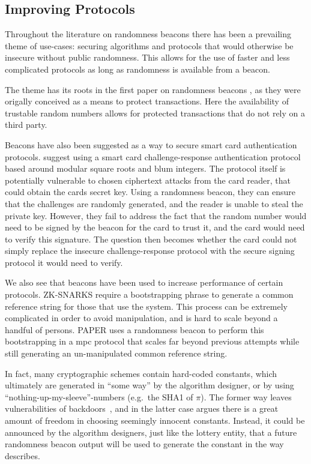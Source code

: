 \subsection{Improving Protocols}
Throughout the literature on randomness beacons there has been a prevailing theme of use-cases: securing algorithms and protocols that would otherwise be insecure without public randomness. This allows for the use of faster and less complicated protocols as long as randomness is available from a beacon.

The theme has its roots in the first paper on randomness beacons \cite{rabin1983transaction}, as they were origally conceived as a means to protect transactions. Here the availability of trustable random numbers allows for protected transactions that do not rely on a third party.

Beacons have also been suggested as a way to secure smart card authentication protocols. \citet{fischer2011publicrandomnessservice} suggest using a smart card challenge-response authentication protocol based around modular square roots and blum integers. The protocol itself is potentially vulnerable to chosen ciphertext attacks from the card reader, that could obtain the cards secret key. Using a randomness beacon, they can ensure that the challenges are randomly generated, and the reader is unable to steal the private key. However, they fail to address the fact that the random number would need to be signed by the beacon for the card to trust it, and the card would need to verify this signature. The question then becomes whether the card could not simply replace the insecure challenge-response protocol with the secure signing protocol it would need to verify.

We also see that beacons have been used to increase performance of certain protocols. ZK-SNARKS require a bootstrapping phrase to generate a common reference string for those that use the system. This process can be extremely complicated in order to avoid manipulation, and is hard to scale beyond a handful of persons. PAPER uses a randomness beacon to perform this bootstrapping in a mpc protocol that scales far beyond previous attempts while still generating an un-manipulated common reference string.

In fact, many cryptographic schemes contain hard-coded constants, which ultimately are generated in \enquote{some way} by the algorithm designer, or by using \enquote{nothing-up-my-sleeve}-numbers (e.g.\ the SHA1 of $\pi$).
The former way leaves vulnerabilities of backdoors~, and in the latter case  argues there is a great amount of freedom in choosing seemingly innocent constants.
Instead, it could be announced by the algorithm designers, just like the lottery entity, that a future randomness beacon output will be used to generate the constant in the way  describes.